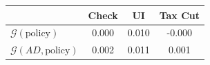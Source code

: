 \begin{tabular}{@{}lccc@{}} 
\toprule 
                          & Check      & UI    & Tax Cut    \\  \midrule 
$\mathcal{G}(\text{policy})$ & 0.000  & 0.010  & -0.000     \\ 
$\mathcal{G}(AD,\text{policy})$ & 0.002  & 0.011  & 0.001     \\ 
\end{tabular}  
